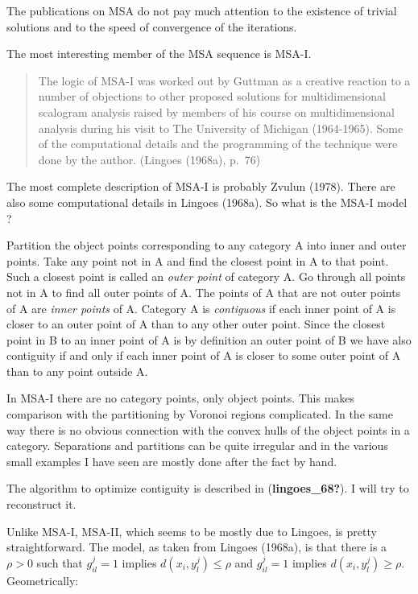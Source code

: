 \documentclass[
  12pt,
]{article}
\begin{document}
The publications on MSA do not pay much attention to the existence
of trivial solutions and to the speed of convergence of the
iterations.

The most interesting member of the MSA sequence is MSA-I.

\begin{quote}
The logic of MSA-I was worked out by Guttman as a creative reaction to a number of objections to other proposed solutions for multidimensional scalogram analysis raised by members of his course on multidimensional analysis during his visit to The University of Michigan (1964-1965).
Some of the computational details and the programming of the technique were done by the author. (Lingoes (1968a), p.~76)
\end{quote}

The most complete description of MSA-I is probably Zvulun (1978). There
are also some computational details in Lingoes (1968a). So what is the
MSA-I model ?

Partition the object points corresponding to any category A into inner and outer points. Take any point not in A and find the closest point in A to that point. Such a closest point is called an \emph{outer point} of category A. Go through all points not in A to find all outer points of A. The points of A that are not outer points of A are \emph{inner points} of A.
Category A is \emph{contiguous} if each inner point of A is closer to an outer point of A than to any other outer point. Since the closest point in B to an inner point of A is by definition an outer point of B we have also contiguity if and only if each inner point of A is closer to some outer point of A than to any point outside A.

In MSA-I there are no category points, only object points. This makes
comparison with the partitioning by Voronoi regions complicated. In
the same way there is no obvious connection with the convex hulls of
the object points in a category. Separations and partitions can be quite
irregular and in the various small examples I have seen are mostly
done after the fact by hand.

The algorithm to optimize contiguity is described in (\textbf{lingoes\_68?}). I will
try to reconstruct it.

Unlike MSA-I, MSA-II, which seems to be mostly due to Lingoes, is
pretty straightforward. The model, as taken from Lingoes (1968a), is that
there is a \(\rho>0\) such that \(g_{il}^j=1\) implies \(d(x_i,y_l^j)\leq\rho\)
and \(g_{il}^j=1\) implies \(d(x_i,y_l^j)\geq\rho\). Geometrically:
\end{document}
